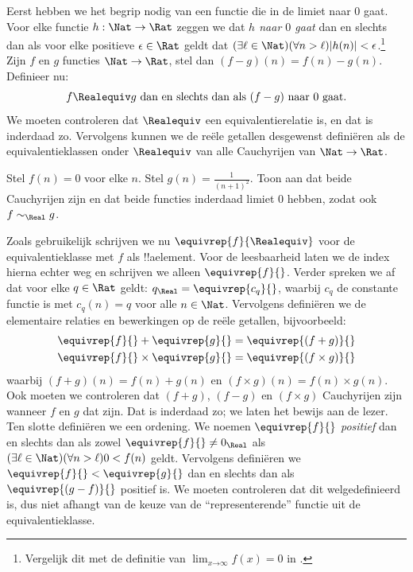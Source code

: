 \documentclass[openany]{memoir}
\begin{document}
Eerst hebben we het begrip nodig van een functie die in de limiet naar
$0$ gaat. Voor elke functie $h : \Nat \to \Rat$ zeggen we dat
\emph{$h$ naar $0$ gaat} dan en slechts dan als voor elke positieve
$\epsilon \in \Rat$ geldt dat $(\exists \ell \in \Nat)(\forall n >
\ell)|h(n)| < \epsilon$.\footnote{Vergelijk dit met de definitie van
$\lim_{x \mathord{\rightarrow}\infty}f(x) = 0$ in
.} Zijn $f$ en $g$ functies $\Nat \to
\Rat$, stel dan $(f-g)(n) = f(n) - g(n)$. Definieer nu:
\[
	f \Realequiv g \text{ dan en slechts dan als $(f-g)$ naar $0$ gaat}.
\]
We moeten controleren dat $\Realequiv$ een equivalentierelatie is, en
dat is inderdaad zo. Vervolgens kunnen we de reële getallen desgewenst
definiëren als de equivalentieklassen onder $\Realequiv$ van alle
Cauchyrijen van $\Nat \to \Rat$.
\begin{prob}
Stel $f(n) = 0$ voor elke $n$. Stel $g(n) = \frac{1}{(n+1)^2}$. Toon
aan dat beide Cauchyrijen zijn en dat beide functies inderdaad limiet
$0$ hebben, zodat ook $f \sim_\Real g$.
\end{prob}
Zoals gebruikelijk schrijven we nu $\equivrep{f}{\Realequiv}$ voor de
equivalentieklasse met $f$ als !!a{element}. Voor de leesbaarheid laten
we de index hierna echter weg en schrijven we alleen
$\equivrep{f}{}$. Verder spreken we af dat voor elke $q \in \Rat$
geldt: $q_{\Real} = \equivrep{c_{q}}{}$, waarbij $c_{q}$ de constante
functie is met $c_q(n) = q$ voor alle $n \in \Nat$. Vervolgens
definiëren we de elementaire relaties en bewerkingen op de reële
getallen, bijvoorbeeld:
\begin{align*}
	\equivrep{f}{} + \equivrep{g}{} &= 	\equivrep{(f + g)}{} \\
	\equivrep{f}{} \times 	\equivrep{g}{} &= \equivrep{(f \times g)}{} 
\end{align*}
waarbij $(f + g)(n) = f(n) + g(n)$ en $(f \times g)(n) = f(n) \times
g(n)$. Ook moeten we controleren dat $(f + g)$, $(f-g)$ en $(f\times
g)$ Cauchyrijen zijn wanneer $f$ en $g$ dat zijn. Dat is inderdaad zo;
we laten het bewijs aan de lezer.
Ten slotte definiëren we een ordening. We noemen $\equivrep{f}{}$
\emph{positief} dan en slechts dan als zowel $\equivrep{f}{}\neq
0_\Real$ als $(\exists \ell \in \Nat)(\forall n > \ell)0 < f(n)$
geldt. Vervolgens definiëren we $\equivrep{f}{} < \equivrep{g}{}$ dan
en slechts dan als $\equivrep{(g - f)}{}$ positief is. We moeten
controleren dat dit welgedefinieerd is, dus niet afhangt van de keuze
van de ``representerende'' functie uit de equivalentieklasse.
\end{document}
